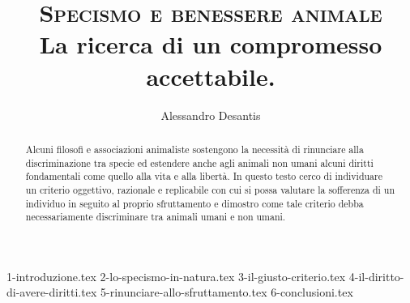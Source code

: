 \documentclass[a4paper,oneside,11pt,article]{memoir}
\title{
\textsc{Specismo e benessere animale}\\
\vspace{1.5mm}
\small{La ricerca di un compromesso accettabile.}
}
\author{Alessandro Desantis}
\date{}
\begin{document}
    \begin{titlingpage}

        \maketitle

        \begin{abstract}
            \begin{center}
                Alcuni filosofi e associazioni animaliste sostengono la necessità di
                rinunciare alla discriminazione tra specie ed estendere anche agli animali non
                umani alcuni diritti fondamentali come quello alla vita e alla libertà. In
                questo testo cerco di individuare un criterio oggettivo, razionale e replicabile
                con cui si possa valutare la sofferenza di un individuo in seguito al proprio
                sfruttamento e dimostro come tale criterio debba necessariamente discriminare
                tra animali umani e non umani.
            \end{center}
        \end{abstract}

    \end{titlingpage}


    {1-introduzione.tex}
    {2-lo-specismo-in-natura.tex}
    {3-il-giusto-criterio.tex}
    {4-il-diritto-di-avere-diritti.tex}
    {5-rinunciare-allo-sfruttamento.tex}
    {6-conclusioni.tex}
\end{document}
